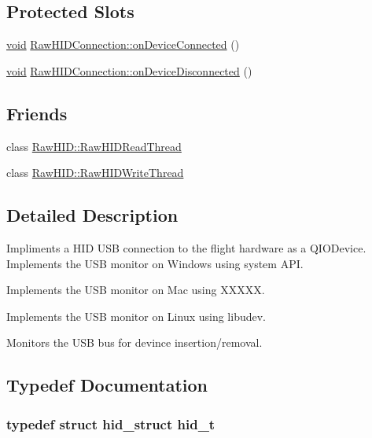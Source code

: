 \subsection*{Protected Slots}
\begin{DoxyCompactItemize}
\item 
\hyperlink{group___u_a_v_objects_plugin_ga444cf2ff3f0ecbe028adce838d373f5c}{void} \hyperlink{group___raw_h_i_d_plugin_gae6fbe6bf878bf78034b81d648fd25edb}{Raw\-H\-I\-D\-Connection\-::on\-Device\-Connected} ()
\item 
\hyperlink{group___u_a_v_objects_plugin_ga444cf2ff3f0ecbe028adce838d373f5c}{void} \hyperlink{group___raw_h_i_d_plugin_gaf84655a7cf624587cf336b550e8c0045}{Raw\-H\-I\-D\-Connection\-::on\-Device\-Disconnected} ()
\end{DoxyCompactItemize}
\subsection*{Friends}
\begin{DoxyCompactItemize}
\item 
class \hyperlink{group___raw_h_i_d_plugin_ga8ff6a2bdea09543bed5912710ec13dab}{Raw\-H\-I\-D\-::\-Raw\-H\-I\-D\-Read\-Thread}
\item 
class \hyperlink{group___raw_h_i_d_plugin_ga2d3d87c46461ab8d3746b207989bb7f8}{Raw\-H\-I\-D\-::\-Raw\-H\-I\-D\-Write\-Thread}
\end{DoxyCompactItemize}


\subsection{Detailed Description}
Impliments a H\-I\-D U\-S\-B connection to the flight hardware as a Q\-I\-O\-Device. Implements the U\-S\-B monitor on Windows using system A\-P\-I.

Implements the U\-S\-B monitor on Mac using X\-X\-X\-X\-X.

Implements the U\-S\-B monitor on Linux using libudev.

Monitors the U\-S\-B bus for devince insertion/removal.

\subsection{Typedef Documentation}
\hypertarget{group___raw_h_i_d_plugin_gace038be945e544c81ea45cabfb08655b}{
\subsubsection[{hid\-\_\-t}]{\setlength{\rightskip}{0pt plus 5cm}typedef {\bf struct} {\bf hid\-\_\-struct} {\bf hid\-\_\-t}}}\label{group___raw_h_i_d_plugin_gace038be945e544c81ea45cabfb08655b}


